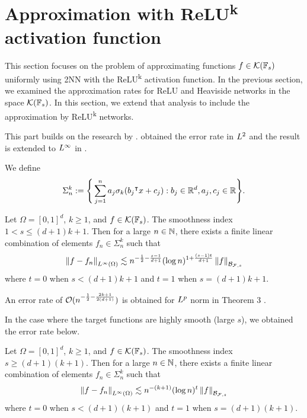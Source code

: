 

\section{Approximation with ReLU\textsuperscript{k} activation function}

This section focuses on the problem of approximating functions $f\in
\mathcal{K}(\mathbb{F}_s)$ uniformly using 2NN with the ReLU\textsuperscript{k}
activation function. In the previous section, we examined the approximation
rates for ReLU and Heaviside networks in the space $\mathcal{K}(\mathbb{F}_s)$. In
this section, we extend that analysis to include the approximation by
ReLU\textsuperscript{k} networks. 

This part builds on the research by
\cite{klusowskiApproximationCombinationsReLU2018a}.
\cite{siegelHighOrderApproximationRates2021} obtained the error rate in $L^{2}$
and the result is extended to $L^{\infty}$ in
\cite{maUniformApproximationRates2022}.


We define 
\begin{equation}
    \Sigma_n^k := \Bigg\{
        \sum_{j=1}^n a_j \sigma_k(b_j{}^{\intercal} x + c_j): 
        b_j \in \mathbb{R}^d, a_j, c_j \in \mathbb{R}
    \Bigg\}.
\end{equation}

\begin{theorem}
    Let $\Omega = [0,1]^d$, $k \geq 1$, and $f \in \mathcal{K}(\mathbb{F}_s)$. The
    smoothness index $1 < s \leq (d+1)k + 1$. Then for a large $n \in \mathbb{N}$,
    there exists a finite linear combination of elements $f_n \in \Sigma_n^k$
    such that
    \begin{equation}
        \left\| f-f_n \right\|_{L^{\infty}(\Omega)} \lesssim 
        n^{-\frac{1}{2} - \frac{s-1}{d+1}}
        (\log{n})^{1 + \frac{(s-1)t}{d+1}}
        \left\| f \right\|_{\mathcal{B}_{\mathcal{F},s}}
    \end{equation}
    where $t=0$ when $s < (d+1)k+1$ and $t=1$ when $s = (d+1)k+1$.
\end{theorem}

An error rate of $\mathcal{O}(n^{-\frac{1}{2}- \frac{2k+1}{2(d+1)}})$ is obtained for
$L^{p}$ norm in Theorem 3 \citep{siegelHighOrderApproximationRates2021}.

In the case where the target functions are highly smooth (large $s$), we
obtained the error rate below.

\begin{theorem}
    Let $\Omega = [0,1]^d$, $k \geq 1$, and $f \in \mathcal{K}(\mathbb{F}_s)$. The
    smoothness index $s \geq (d+1)(k+1)$. Then for a large $n \in \mathbb{N}$, there
    exists a finite linear combination of elements $f_n \in \Sigma_n^k$ such
    that
    \begin{equation}
        \left\| f-f_n \right\|_{L^{\infty}(\Omega)} \lesssim 
        n^{-(k+1)} (\log{n})^t \left\| f \right\|_{\mathcal{B}_{\mathcal{F},s}}
    \end{equation}
    where $t=0$ when $s < (d+1)(k+1)$ and $t=1$ when $s = (d+1)(k+1)$.
\end{theorem}

